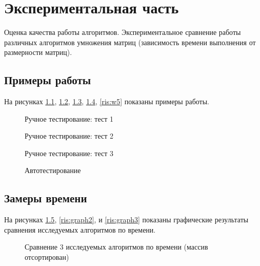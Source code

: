 


\chapter{Экспериментальная часть}\label{exp}

Оценка качества работы алгоритмов. Экспериментальное сравнение работы различных алгоритмов умножения матриц 
(зависимость времени выполнения от размерности матриц).

\section{Примеры работы}\label{examples}

На рисунках \ref{ris:w1}, \ref{ris:w2}, \ref{ris:w3}, \ref{ris:w4}, \ref{ris:w5} показаны примеры работы.

\begin{figure}[H]
    \center{\texttt{[image: w1]}}
    \caption{Ручное тестирование: тест 1}
    \label{ris:w1}
\end{figure}
  
\begin{figure}[H]
    \center{\texttt{[image: w2]}}
    \caption{Ручное тестирование: тест 2}
    \label{ris:w2}
\end{figure}
  
\begin{figure}[H]
    \center{\texttt{[image: w3]}}
    \caption{Ручное тестирование: тест 3}
    \label{ris:w3}
\end{figure}
  
\begin{figure}[H]
    \center{\texttt{[image: w4]}}
    \caption{Автотестирование}
    \label{ris:w4}
\end{figure}
\section{Замеры времени}\label{experimentgraph}

На рисунках \ref{ris:graph1}, \ref{ris:graph2}, и \ref{ris:graph3} показаны графические результаты сравнения исследуемых алгоритмов по времени. 

\begin{figure}[H]
    \caption{Сравнение 3 исследуемых алгоритмов по времени (массив отсортирован)}
    \label{ris:graph1}
\end{figure}

